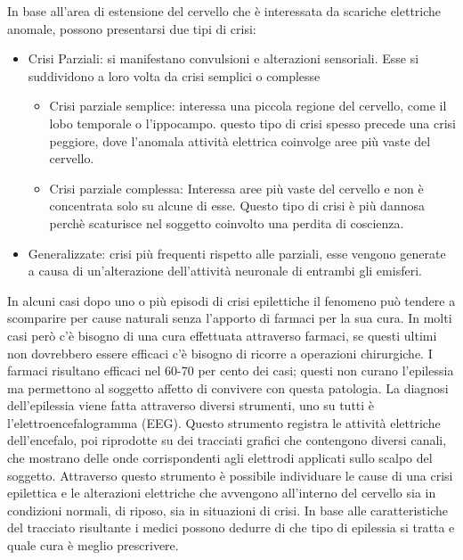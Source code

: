 \documentclass{article}
\begin{document}
In base all'area di estensione del cervello che è interessata da scariche elettriche anomale, possono presentarsi due tipi di crisi:
\begin{itemize}
\item Crisi Parziali:  si manifestano convulsioni e alterazioni sensoriali. Esse si suddividono a loro volta da crisi semplici o complesse 
\begin{itemize}
\item Crisi parziale semplice: interessa una piccola regione del cervello, come il lobo temporale o l'ippocampo. questo tipo di crisi spesso precede una crisi peggiore, dove l'anomala attività elettrica coinvolge aree più vaste del cervello.
\item Crisi parziale complessa: Interessa aree più vaste del cervello e non è concentrata solo su alcune di esse. Questo tipo di crisi è più dannosa perchè scaturisce nel soggetto coinvolto una perdita di coscienza.
\end{itemize}
\item Generalizzate: crisi più frequenti rispetto alle parziali, esse vengono generate a causa di un'alterazione dell'attività neuronale di  entrambi gli emisferi.
\end{itemize}
 In alcuni casi dopo uno o più episodi di crisi epilettiche il fenomeno può tendere a scomparire per cause naturali senza l'apporto di farmaci per la sua cura. In molti casi però c'è bisogno di una cura effettuata attraverso farmaci, se questi ultimi non dovrebbero essere efficaci c'è bisogno di ricorre a operazioni chirurgiche.
I farmaci risultano efficaci nel 60-70 per cento dei casi; questi non curano l'epilessia ma permettono al soggetto affetto di convivere con questa patologia.
 La diagnosi dell'epilessia viene fatta attraverso diversi strumenti, uno su tutti è l'elettroencefalogramma (EEG). Questo strumento registra le attività elettriche dell'encefalo, poi riprodotte su dei tracciati grafici che contengono diversi canali,  che mostrano delle onde corrispondenti agli elettrodi applicati sullo scalpo del soggetto.
 Attraverso questo strumento è possibile individuare le cause di una crisi epilettica e le alterazioni  elettriche che avvengono all'interno del cervello sia in condizioni normali, di riposo, sia in situazioni di crisi. In base alle caratteristiche del tracciato risultante i medici possono dedurre di che tipo di epilessia si tratta e quale cura è meglio prescrivere. 
\end{document}
